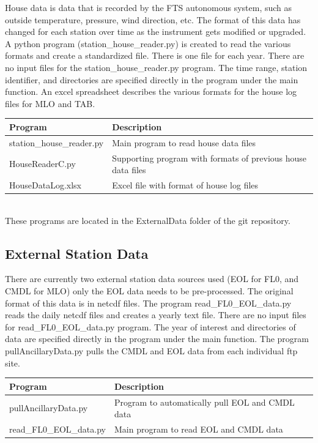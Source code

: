 \documentclass[12pt, letterpaper]{article}
\begin{document}
House data is data that is recorded by the FTS autonomous system, such as outside temperature, pressure, wind direction, etc. The format of this data has changed for each station over time as the instrument gets modified or upgraded. A python program (station\_house\_reader.py) is created to read the various formats and create a standardized file. There is one file for each year. There are no input files for the station\_house\_reader.py program. The time range, station identifier, and directories are specified directly in the program under the main function. An excel spreadsheet describes the various formats for the house log files for MLO and TAB.\\

\begin{tabular}{ l l }
\textbf{Program} & \textbf{Description} \\
\hline
station\_house\_reader.py & Main program to read house data files\\
HouseReaderC.py           & Supporting program with formats of previous house data files \\
HouseDataLog.xlsx         & Excel file with format of house log files\\
\end{tabular} \\

These programs are located in the ExternalData folder of the git repository.


\subsection{External Station Data}
\label{sec:ED}

There are currently two external station data sources used (EOL for FL0, and CMDL for MLO) only the EOL data needs to be pre-processed. The original format of this data is in netcdf files. The program read\_FL0\_EOL\_data.py reads the daily netcdf files and creates a yearly text file. There are no input files for read\_FL0\_EOL\_data.py program. The year of interest and directories of data are specified directly in the program under the main function.  The program pullAncillaryData.py pulls the CMDL and EOL data from each individual ftp site. \\

\begin{tabular}{ l l }
\textbf{Program} & \textbf{Description} \\
\hline
pullAncillaryData.py    & Program to automatically pull EOL and CMDL data\\
read\_FL0\_EOL\_data.py & Main program to read EOL and CMDL data \\
\end{tabular} \\
\end{document}

